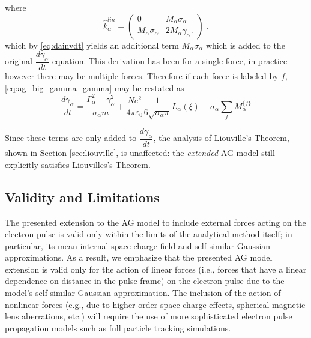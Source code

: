 where
\begin{equation}
\hat{k}^{lin}_{\alpha} =
\begin{pmatrix}
0 & M_{\alpha} \sigma_{\alpha} \\
M_{\alpha} \sigma_{\alpha} & 2 M_{\alpha} \gamma_{\alpha} \text{.}
\end{pmatrix} \text{ .}
\end{equation}
which by \ref{eq:dainvdt} yields an additional term $M_{\alpha} \sigma_{\alpha}$ which is added to the original $\dfrac{d \gamma_{\alpha}}{d t}$ equation.
This derivation has been for a single force, in practice however there may be multiple forces.
Therefore if each force is labeled by $f$, \ref{eq:ag_big_gamma_gamma} may be restated as
\begin{equation}
  \frac{d\gamma_{\alpha}}{dt} = \frac{ \Gamma_{\alpha}^2 + \gamma_{\alpha}^2 }{\sigma_{\alpha} m}
    + \frac{N e^2}{4\pi\varepsilon_0} \frac{1}{6 \sqrt{\sigma_{\alpha}\pi}} L_{\alpha}(\xi) + \sigma_{\alpha} \sum\limits_{f} M_{\alpha}^{\lbrace f \rbrace} 
\end{equation}

Since these terms are only added to $\dfrac{d \gamma_{\alpha}}{d t}$, the analysis of Liouville's Theorem, shown in Section \ref{sec:liouville}, is unaffected: the \textit{extended} AG model still explicitly satisfies Liouvilles's Theorem.

\subsection{Validity and Limitations}

The presented extension to the AG model to include external forces acting on the electron pulse is valid only within the limits of the analytical method itself; in particular, its mean internal space-charge field and self-similar Gaussian approximations.\cite{michalik_analytic_2006}
As a result, we emphasize that the presented AG model extension is valid only for the action of linear forces (i.e., forces that have a linear dependence on distance in the pulse frame) on the electron pulse due to the model's self-similar Gaussian approximation.
The inclusion of the action of nonlinear forces (e.g., due to higher-order space-charge effects, spherical magnetic lens aberrations, etc.) will require the use of more sophisticated electron pulse propagation models such as full particle tracking simulations.%


